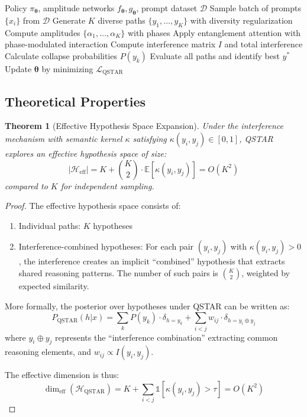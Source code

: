 \documentclass[11pt,a4paper]{article}
\newtheorem{theorem}{Theorem}[section]
\newcommand{\E}{\mathbb{E}}
\newcommand{\calL}{\mathcal{L}}
\newcommand{\calH}{\mathcal{H}}
\newcommand{\calD}{\mathcal{D}}
\newcommand{\btheta}{\bm{\theta}}
\begin{document}
\begin{algorithm}[t]
\caption{QSTAR Training}
\label{alg:qstar}
\begin{algorithmic}[1]
\REQUIRE Policy $\pi_\btheta$, amplitude networks $f_\btheta, g_\btheta$, prompt dataset $\calD$
    \STATE Sample batch of prompts $\{x_i\}$ from $\calD$
        \STATE Generate $K$ diverse paths $\{y_1, \ldots, y_K\}$ with diversity regularization
        \STATE Compute amplitudes $\{\alpha_1, \ldots, \alpha_K\}$ with phases
        \STATE Apply entanglement attention with phase-modulated interaction
        \STATE Compute interference matrix $I$ and total interference
        \STATE Calculate collapse probabilities $P(y_k)$
        \STATE Evaluate all paths and identify best $y^*$
    \ENDFOR
    \STATE Update $\btheta$ by minimizing $\calL_{\text{QSTAR}}$
\ENDFOR
\end{algorithmic}
\end{algorithm}

\subsection{Theoretical Properties}

\begin{theorem}[Effective Hypothesis Space Expansion]
\label{thm:qstar_hypothesis}
Under the interference mechanism with semantic kernel $\kappa$ satisfying $\kappa(y_i, y_j) \in [0,1]$, QSTAR explores an effective hypothesis space of size:
\begin{equation}
    |\calH_{\text{eff}}| = K + \binom{K}{2} \cdot \E[\kappa(y_i, y_j)] = O(K^2)
\end{equation}
compared to $K$ for independent sampling.
\end{theorem}

\begin{proof}
The effective hypothesis space consists of:
\begin{enumerate}
    \item Individual paths: $K$ hypotheses
    \item Interference-combined hypotheses: For each pair $(y_i, y_j)$ with $\kappa(y_i, y_j) > 0$, the interference creates an implicit ``combined'' hypothesis that extracts shared reasoning patterns. The number of such pairs is $\binom{K}{2}$, weighted by expected similarity.
\end{enumerate}

More formally, the posterior over hypotheses under QSTAR can be written as:
\begin{equation}
    P_{\text{QSTAR}}(h|x) = \sum_k P(y_k) \cdot \delta_{h=y_k} + \sum_{i<j} w_{ij} \cdot \delta_{h=y_i \oplus y_j}
\end{equation}
where $y_i \oplus y_j$ represents the ``interference combination'' extracting common reasoning elements, and $w_{ij} \propto I(y_i, y_j)$.

The effective dimension is thus:
\begin{equation}
    \dim_{\text{eff}}(\calH_{\text{QSTAR}}) = K + \sum_{i<j} \mathbb{1}[\kappa(y_i, y_j) > \tau] = O(K^2)
\end{equation}
\end{proof}
\end{document}
